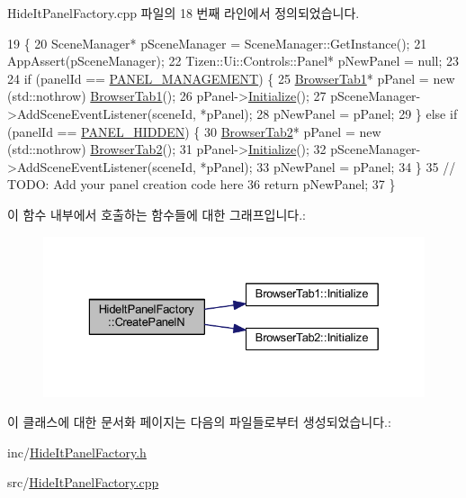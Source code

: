 Hide\+It\+Panel\+Factory.\+cpp 파일의 18 번째 라인에서 정의되었습니다.


\begin{DoxyCode}
19                                              \{
20     SceneManager* pSceneManager = SceneManager::GetInstance();
21     AppAssert(pSceneManager);
22     Tizen::Ui::Controls::Panel* pNewPanel = null;
23 
24     \textcolor{keywordflow}{if} (panelId == \hyperlink{_hide_it_panel_factory_8cpp_adfa2b4ae9db98acfbf94879073f53f0d}{PANEL\_MANAGEMENT}) \{
25         \hyperlink{class_browser_tab1}{BrowserTab1}* pPanel = \textcolor{keyword}{new} (std::nothrow) \hyperlink{class_browser_tab1}{BrowserTab1}();
26         pPanel->\hyperlink{class_browser_tab1_ae8f2b22d3dd917b599c7f46549079687}{Initialize}();
27         pSceneManager->AddSceneEventListener(sceneId, *pPanel);
28         pNewPanel = pPanel;
29     \} \textcolor{keywordflow}{else} \textcolor{keywordflow}{if} (panelId == \hyperlink{_hide_it_panel_factory_8cpp_a99fea23768afc488a86d71365b090b9e}{PANEL\_HIDDEN}) \{
30         \hyperlink{class_browser_tab2}{BrowserTab2}* pPanel = \textcolor{keyword}{new} (std::nothrow) \hyperlink{class_browser_tab2}{BrowserTab2}();
31         pPanel->\hyperlink{class_browser_tab2_af5555db1615474a69781b25373828749}{Initialize}();
32         pSceneManager->AddSceneEventListener(sceneId, *pPanel);
33         pNewPanel = pPanel;
34     \}
35     \textcolor{comment}{// TODO: Add your panel creation code here}
36     \textcolor{keywordflow}{return} pNewPanel;
37 \}
\end{DoxyCode}


이 함수 내부에서 호출하는 함수들에 대한 그래프입니다.\+:
\nopagebreak
\begin{figure}[H]
\begin{center}
\leavevmode
\includegraphics[width=329pt]{class_hide_it_panel_factory_ac136170b6628fde782350fd269e41a54_cgraph}
\end{center}
\end{figure}




이 클래스에 대한 문서화 페이지는 다음의 파일들로부터 생성되었습니다.\+:\begin{DoxyCompactItemize}
\item 
inc/\hyperlink{_hide_it_panel_factory_8h}{Hide\+It\+Panel\+Factory.\+h}\item 
src/\hyperlink{_hide_it_panel_factory_8cpp}{Hide\+It\+Panel\+Factory.\+cpp}\end{DoxyCompactItemize}
